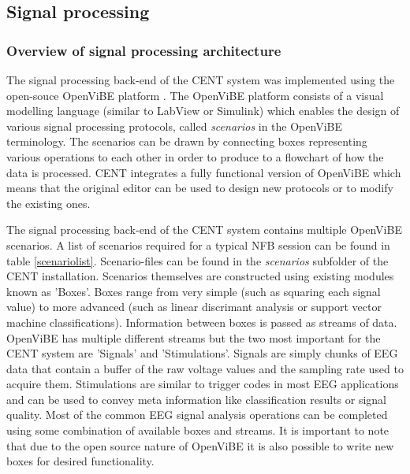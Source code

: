 \subsection{Signal processing}

\subsubsection{Overview of signal processing architecture}
The signal processing back-end of the CENT system was implemented using the open-souce OpenViBE platform \cite{renard2010openvibe}. The OpenViBE platform consists of a visual modelling language (similar to LabView or Simulink) which enables the design of various signal processing protocols, called \textit{scenarios} in the OpenViBE terminology. The scenarios can be drawn by connecting boxes representing various operations to each other in order to produce to a flowchart of how the data is processed. CENT integrates a fully functional version of OpenViBE which means that the original editor can be used to design new protocols or to modify the existing ones.

The signal processing back-end of the CENT system contains multiple OpenViBE scenarios. A list of scenarios required for a typical NFB session can be found in table \ref{scenariolist}. Scenario-files can be found in the \textit{scenarios} subfolder of the CENT installation. Scenarios themselves are constructed using existing modules known as 'Boxes'. Boxes range from very simple (such as squaring each signal value) to more advanced (such as linear discrimant analysis or support vector machine classifications). Information between boxes is passed as streams of data. OpenViBE has multiple different streams but the two most important for the CENT system are 'Signals' and 'Stimulations'. Signals are simply chunks of EEG data that contain a buffer of the raw voltage values and the sampling rate used to acquire them. Stimulations are similar to trigger codes in most EEG applications and can be used to convey meta information like classification results or signal quality. Most of the common EEG signal analysis operations can be completed using some combination of available boxes and streams. It is important to note that due to the open source nature of OpenViBE it is also possible to write new boxes for desired functionality.

